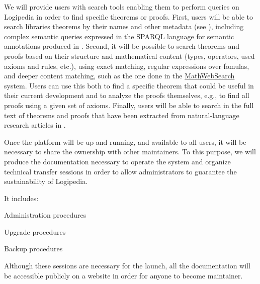 \begin{workpackage}[id=access,wphases=0-48,type=MGT,
  short=Access,%
  title={Access to the infrastructure},
  lead=Inr,
  InrRM=28,%
  OcaRM=6]
\begin{tasklist}
  \begin{task}[id=search,
      title=Providing search tools,
      lead=Inr,InrRM=28,FauRM=24,SacRM=6,BolRM=4]%
    We will provide users with search tools enabling them to perform
    queries on Logipedia in order to find specific theorems or proofs.
    First, users will be able to search libraries theorems by their
    names and other metadata (see ),
    including complex semantic queries expressed in the SPARQL
    language for semantic annotations produced in
    . Second, it will be possible to
    search theorems and proofs based on their structure and
    mathematical content (types, operators, used axioms and rules,
    etc.), using exact matching, regular expressions over fomulas, and
    deeper content matching, such as the one done in the
    \hyperlink{https://kwarc.info/systems/mws/}{MathWebSearch}
    system. Users can use this both to find a specific theorem that
    could be useful in their current development and to analyze the
    proofs themselves, e.g., to find all proofs using a given set of
    axioms.  Finally, users will be able to search in the full text of
    theorems and proofs that have been extracted from natural-language
    research articles in .
  \end{task}

  \begin{task}[id=transfer,
      title=Transfer for the sustainability of the system,
      lead=Irt]
    Once the platform will be up and running, and available to all
    users, it will be necessary to share the ownership with other
    maintainers. To this purpose, we will produce the documentation
    necessary to operate the system and organize technical transfer
    sessions in order to allow administrators to guarantee the
    sustainability of Logipedia.

    It includes:
    \begin{compactitem}
    \item Administration procedures
    \item Upgrade procedures
    \item Backup procedures
    \end{compactitem}

    Although these sessions are necessary for the launch, all the
    documentation will be accessible publicly on a website in order
    for anyone to become maintainer.
  \end{task}


\end{tasklist}
\end{workpackage}
